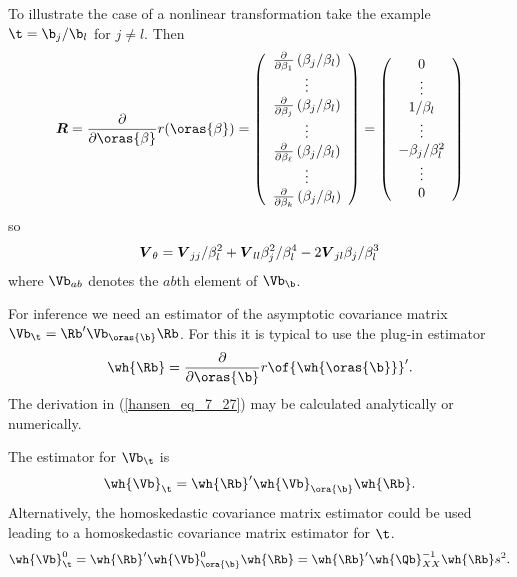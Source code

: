 To illustrate the case of a nonlinear transformation take the example $\t = \b_j / \b_l$ for $j \neq l$. Then 
\begin{equation}
    \label{hansen_eq_7_26}
    \boldsymbol{R}=\frac{\partial}{\partial \oras{\beta}} r(\oras{\beta})=\left(\begin{array}{c}
        \frac{\partial}{\partial \beta_1}\left(\beta_j / \beta_l\right) \\
        \vdots \\
        \frac{\partial}{\partial \beta_j}\left(\beta_j / \beta_l\right) \\
        \vdots \\
        \frac{\partial}{\partial \beta_{\ell}}\left(\beta_j / \beta_l\right) \\
        \vdots \\
        \frac{\partial}{\partial \beta_k}\left(\beta_j / \beta_l\right)
        \end{array}\right)=\left(\begin{array}{c}
        0 \\
        \vdots \\
        1 / \beta_l \\
        \vdots \\
        -\beta_j / \beta_l^2 \\
        \vdots \\
        0
        \end{array}\right)
\end{equation}
so 
\begin{equation}
    \notag
    \boldsymbol{V}_\theta=\boldsymbol{V}_{j j} / \beta_l^2+\boldsymbol{V}_{l l} \beta_j^2 / \beta_l^4-2 \boldsymbol{V}_{j l} \beta_j / \beta_l^3
\end{equation}
where $\Vb_{ab}$ denotes the $ab$th element of $\Vb_{\b}$.

For inference we need an estimator of the asymptotic covariance matrix $\Vb_\t = \Rb^\prime \Vb_{\oras{\b}} \Rb$. For this it is typical to use the plug-in estimator 
\begin{equation}
    \label{hansen_eq_7_27}
    \wh{\Rb} = \frac{\partial}{\partial \oras{\b}} r\of{\wh{\oras{\b}}}^\prime.
\end{equation}
The derivation in (\ref{hansen_eq_7_27}) may be calculated analytically or numerically.

The estimator for $\Vb_\t$ is 
\begin{equation}
    \label{hansen_eq_7_28}
    \wh{\Vb}_\t = \wh{\Rb}^\prime \wh{\Vb}_{\ora{\b}} \wh{\Rb}. 
\end{equation}
Alternatively, the homoskedastic covariance matrix estimator could be used leading to a homoskedastic covariance matrix estimator for $\t$.
\begin{equation}
    \label{hansen_eq_7_29}
    \wh{\Vb}_\t^0 = \wh{\Rb}^\prime \wh{\Vb}_{\ora{\b}}^0 \wh{\Rb} = \wh{\Rb}^\prime \wh{\Qb}_{XX}^{-1} \wh{\Rb} s^2. 
\end{equation}

